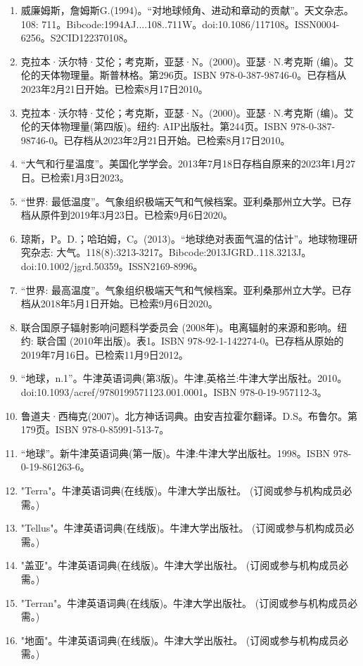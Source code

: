\begin{enumerate}
\item 威廉姆斯，詹姆斯G.(1994)。“对地球倾角、进动和章动的贡献”。天文杂志。108: 711。Bibcode:1994AJ....108..711W。doi:10.1086/117108。ISSN0004-6256。S2CID122370108。  
\item 克拉本·沃尔特·艾伦；考克斯，亚瑟·N。(2000)。亚瑟·N.考克斯 (编)。艾伦的天体物理量。斯普林格。第296页。ISBN 978-0-387-98746-0。已存档从2023年2月21日开始。已检索8月17日2010。
\item 克拉本·沃尔特·艾伦；考克斯，亚瑟·N。(2000)。亚瑟·N.考克斯 (编)。艾伦的天体物理量(第四版)。纽约: AIP出版社。第244页。ISBN 978-0-387-98746-0。已存档从2023年2月21日开始。已检索8月17日2010。
\item “大气和行星温度”。美国化学学会。2013年7月18日存档自原来的2023年1月27日。已检索1月3日2023。
\item “世界: 最低温度”。气象组织极端天气和气候档案。亚利桑那州立大学。已存档从原件到2019年3月23日。已检索9月6日2020。
\item 琼斯，P。D.；哈珀姆，C。(2013)。“地球绝对表面气温的估计”。地球物理研究杂志: 大气。118(8):3213-3217。Bibcode:2013JGRD..118.3213J。doi:10.1002/jgrd.50359。ISSN2169-8996。 
\item “世界: 最高温度”。气象组织极端天气和气候档案。亚利桑那州立大学。已存档从2018年5月1日开始。已检索9月6日2020。
\item 联合国原子辐射影响问题科学委员会 (2008年)。电离辐射的来源和影响。纽约: 联合国 (2010年出版)。表1。ISBN 978-92-1-142274-0。已存档从原始的2019年7月16日。已检索11月9日2012。
\item “地球，n.1”。牛津英语词典(第3版)。牛津,英格兰:牛津大学出版社。2010。doi:10.1093/acref/9780199571123.001.0001。ISBN 978-0-19-957112-3。
\item 鲁道夫·西梅克(2007)。北方神话词典。由安吉拉霍尔翻译。D.S。布鲁尔。第179页。ISBN 978-0-85991-513-7。
\item “地球”。新牛津英语词典(第一版)。牛津:牛津大学出版社。1998。ISBN 978-0-19-861263-6。
\item "Terra"。牛津英语词典(在线版)。牛津大学出版社。 (订阅或参与机构成员必需。)
\item "Tellus"。牛津英语词典(在线版)。牛津大学出版社。 (订阅或参与机构成员必需。)
\item "盖亚"。牛津英语词典(在线版)。牛津大学出版社。 (订阅或参与机构成员必需。)
\item "Terran"。牛津英语词典(在线版)。牛津大学出版社。 (订阅或参与机构成员必需。)
\item "地面"。牛津英语词典(在线版)。牛津大学出版社。 (订阅或参与机构成员必需。)

\end{enumerate}
